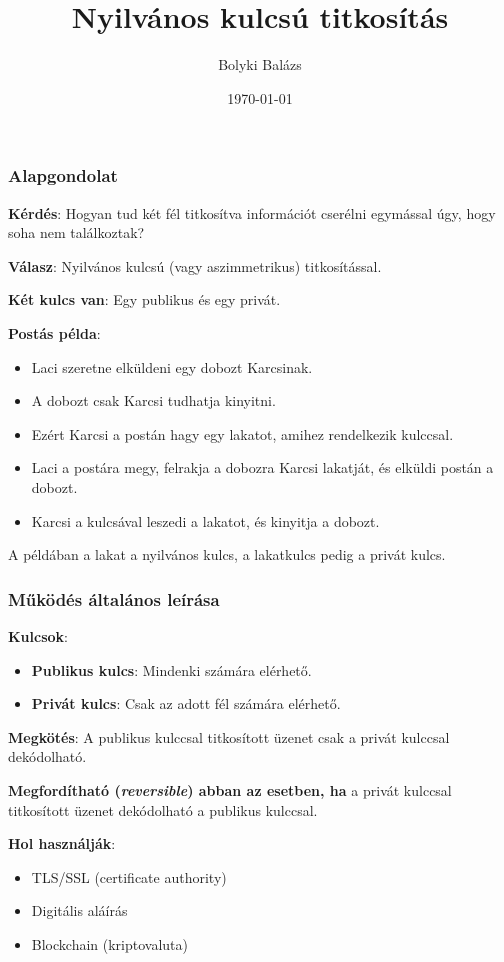 \documentclass{beamer}
\title{Nyilvános kulcsú titkosítás}
\author{Bolyki Balázs}
\institute{Miskolci Egyetem}
\date{\today}
\begin{document}
\titlepage

\begin{frame}
    \frametitle{Alapgondolat}
    \textbf{Kérdés}: Hogyan tud két fél titkosítva információt cserélni egymással úgy, hogy soha nem találkoztak?

    \textbf{Válasz}: Nyilvános kulcsú (vagy aszimmetrikus) titkosítással.

    \textbf{Két kulcs van}: Egy publikus és egy privát.

    \textbf{Postás példa}:

    \begin{itemize}
        \item Laci szeretne elküldeni egy dobozt Karcsinak.
        \item A dobozt csak Karcsi tudhatja kinyitni.
        \item Ezért Karcsi a postán hagy egy lakatot, amihez rendelkezik kulccsal.
        \item Laci a postára megy, felrakja a dobozra Karcsi lakatját, és elküldi postán a dobozt.
        \item Karcsi a kulcsával leszedi a lakatot, és kinyitja a dobozt.
    \end{itemize}

    A példában a lakat a nyilvános kulcs, a lakatkulcs pedig a privát kulcs.

\end{frame}

\begin{frame}
    \frametitle{Működés általános leírása}

    \textbf{Kulcsok}:
    \begin{itemize}
        \item \textbf{Publikus kulcs}: Mindenki számára elérhető.
        \item \textbf{Privát kulcs}: Csak az adott fél számára elérhető.
    \end{itemize}
    \textbf{Megkötés}: A publikus kulccsal titkosított üzenet csak a privát kulccsal dekódolható.

    \textbf{Megfordítható (\textit{reversible}) abban az esetben, ha } a privát kulccsal titkosított
    üzenet dekódolható a publikus kulccsal.

    \textbf{Hol használják}:
    \begin{itemize}
        \item TLS/SSL (certificate authority)
        \item Digitális aláírás
        \item Blockchain (kriptovaluta)
    \end{itemize}
\end{frame}
\end{document}
